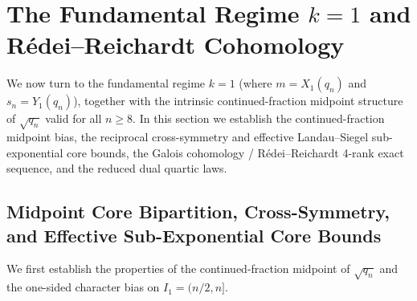 \documentclass[11pt,reqno]{amsart}
\theoremstyle{remark}
\numberwithin{equation}{section}
\begin{document}
\section{The Fundamental Regime $k = 1$ and R\'edei--Reichardt Cohomology}\label{sec:5}

We now turn to the fundamental regime $k = 1$ (where $m = X_1(q_n)$ and $s_n = Y_1(q_n)$), together with the intrinsic continued-fraction midpoint structure of $\sqrt{q_n}$ valid for all $n \ge 8$. In this section we establish the continued-fraction midpoint bias, the reciprocal cross-symmetry and effective Landau--Siegel sub-exponential core bounds, the Galois cohomology / R\'edei--Reichardt 4-rank exact sequence, and the reduced dual quartic laws.

\subsection{Midpoint Core Bipartition, Cross-Symmetry, and Effective Sub-Exponential Core Bounds}
We first establish the properties of the continued-fraction midpoint of $\sqrt{q_n}$ and the one-sided character bias on $I_1 = (n/2, n]$.
\end{document}
